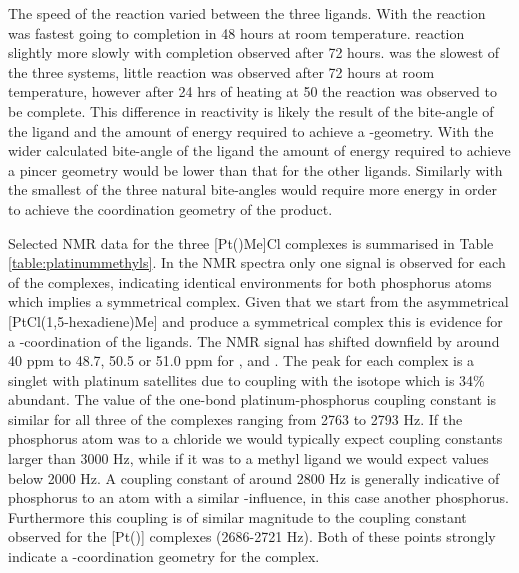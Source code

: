 The speed of the reaction varied between the three ligands.  With \tBuxantphos{} the reaction was fastest going to completion in 48 hours at room temperature.  \tButhixantphos{} reaction slightly more slowly with completion observed after 72 hours.  \tBusixantphos{} was the slowest of the three systems, little reaction was observed after 72 hours at room temperature, however after 24 hrs of heating at 50 \degC{} the reaction was observed to be complete.  This difference in reactivity is likely the result of the bite-angle of the ligand and the amount of energy required to achieve a \trans{}-geometry.  With the wider calculated bite-angle of the \tBuxantphos{} ligand the amount of energy required to achieve a pincer geometry would be lower than that for the other ligands.  Similarly \tBusixantphos{} with the smallest of the three natural bite-angles would require more energy in order to achieve the coordination geometry of the product.  

Selected NMR data for the three [Pt(\POP)Me]Cl complexes is summarised in Table \ref{table:platinummethyls}.  In the \phosphorus{} NMR spectra only one signal is observed for each of the complexes, indicating identical environments for both phosphorus atoms which implies a symmetrical complex.  Given that we start from the asymmetrical [PtCl(1,5-hexadiene)Me] and produce a symmetrical complex this is evidence for a \trans{}-coordination of the \tBuxantphos{} ligands.  The \phosphorus{} NMR signal has shifted downfield by around 40 ppm to 48.7, 50.5 or 51.0 ppm for \tBusixantphos, \tButhixantphos{} and \tBuxantphos{}.  The peak for each complex is a singlet with platinum satellites due to coupling with the \Pt{} isotope which is 34\% abundant.  The value of the one-bond platinum-phosphorus coupling constant is similar for all three of the complexes ranging from 2763 to 2793 Hz.  If the phosphorus atom was \trans{} to a chloride we would typically expect coupling constants larger than 3000 Hz, while if it was \trans{} to a methyl ligand we would expect values below 2000 Hz.  A coupling constant of around 2800 Hz is generally indicative of phosphorus \trans{} to an atom with a similar \trans-influence, in this case another phosphorus.  Furthermore this coupling is of similar magnitude to the coupling constant observed for the [Pt(\tBuxantphos)] complexes (2686-2721 Hz).  Both of these points strongly indicate a \trans{}-coordination geometry for the complex.

